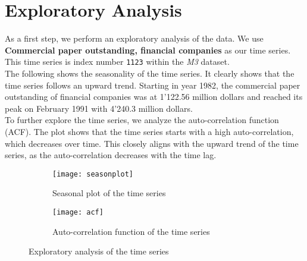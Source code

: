 \section{Exploratory Analysis}\label{sec:exploratory-analysis}

As a first step, we perform an exploratory analysis of the data.
We use \textbf{Commercial paper outstanding, financial companies} as our time series.
This time series is index number \texttt{1123} within the \textit{M3} dataset.\\

The following  shows the seasonality of the time series.
It clearly shows that the time series follows an upward trend.
Starting in year 1982, the commercial paper outstanding of financial companies was at 1'122.56 million dollars
and reached its peak on February 1991 with 4'240.3 million dollars.\\

To further explore the time series, we analyze the auto-correlation function (ACF).
The plot shows that the time series starts with a high auto-correlation, which decreases over time.
This closely aligns with the upward trend of the time series, as the auto-correlation decreases with the time lag.\\


\begin{figure}[h]
  \begin{subfigure}{.5\textwidth}
  \centering
    \texttt{[image: seasonplot]}
    \caption{Seasonal plot of the time series}
  \end{subfigure}%
  \begin{subfigure}{.5\textwidth}
  \centering
    \texttt{[image: acf]}
    \caption{Auto-correlation function of the time series}
  \end{subfigure}
  \caption{Exploratory analysis of the time series}
  \label{fig:sesaonplot}
\end{figure}
